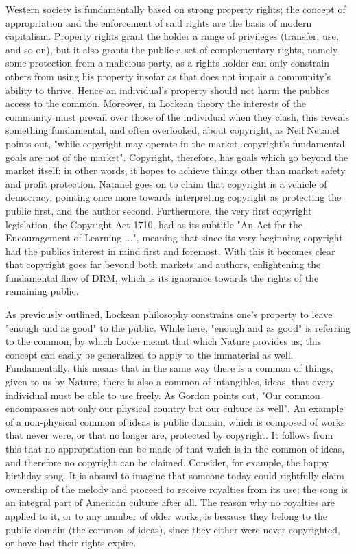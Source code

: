 \documentclass[12pt]{article}
\begin{document}
Western society is fundamentally based on strong property rights; the concept of appropriation and the enforcement of said rights are the basis of modern capitalism. Property rights grant the holder a range of privileges (transfer, use, and so on), but it also grants the public a set of complementary rights, namely some protection from a malicious party, as a rights holder can only constrain others from using his property insofar as that does not impair a community's ability to thrive\cite[p.1555-1560]{gordon}. Hence an individual's property should not harm the publics access to the common. Moreover, in Lockean theory the interests of the community must prevail over those of the individual when they clash\cite[p.120]{favale}, this reveals something fundamental, and often overlooked, about copyright, as Neil Netanel points out, "while copyright may operate in the market, copyright's fundamental goals are not of the market"\cite[p.341]{netanel}. Copyright, therefore, has goals which go beyond the market itself; in other words, it hopes to achieve things other than market safety and profit protection. Natanel goes on to claim that copyright is a vehicle of democracy, pointing once more towards interpreting copyright as protecting the public first, and the author second. Furthermore, the very first copyright legislation, the Copyright Act 1710, had as its subtitle "An Act for the Encouragement of Learning ..."\cite{wortley}, meaning that since its very beginning copyright had the publics interest in mind first and foremost. With this it becomes clear that copyright goes far beyond both markets and authors, enlightening the fundamental flaw of DRM, which is its ignorance towards the rights of the remaining public.

As previously outlined, Lockean philosophy constrains one's property to leave "enough and as good"\cite[p.291]{locke} to the public. While here, "enough and as good" is referring to the common, by which Locke meant that which Nature provides us, this concept can easily be generalized to apply to the immaterial as well. Fundamentally, this means that in the same way there is a common of things, given to us by Nature, there is also a common of intangibles, ideas, that every individual must be able to use freely. As Gordon points out, "Our common encompasses not only our physical country but our culture as well"\cite[p.1555]{gordon}. An example of a non-physical common of ideas is public domain, which is composed of works that never were, or that no longer are, protected by copyright. It follows from this that no appropriation can be made of that which is in the common of ideas, and therefore no copyright can be claimed. Consider, for example, the happy birthday song. It is absurd to imagine that someone today could rightfully claim ownership of the melody and proceed to receive royalties from its use; the song is an integral part of American culture after all. The reason why no royalties are applied to it, or to any number of older works, is because they belong to the public domain (the common of ideas), since they either were never copyrighted, or have had their rights expire.
\end{document}
